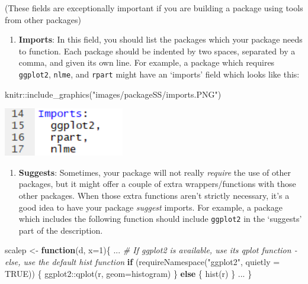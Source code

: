 \documentclass[
]{book}
\newenvironment{Shaded}{\begin{snugshade}}{\end{snugshade}}
\newcommand{\AttributeTok}[1]{\textcolor[rgb]{0.77,0.63,0.00}{#1}}
\newcommand{\CommentTok}[1]{\textcolor[rgb]{0.56,0.35,0.01}{\textit{#1}}}
\newcommand{\ConstantTok}[1]{\textcolor[rgb]{0.00,0.00,0.00}{#1}}
\newcommand{\ControlFlowTok}[1]{\textcolor[rgb]{0.13,0.29,0.53}{\textbf{#1}}}
\newcommand{\DecValTok}[1]{\textcolor[rgb]{0.00,0.00,0.81}{#1}}
\newcommand{\FunctionTok}[1]{\textcolor[rgb]{0.00,0.00,0.00}{#1}}
\newcommand{\NormalTok}[1]{#1}
\newcommand{\OtherTok}[1]{\textcolor[rgb]{0.56,0.35,0.01}{#1}}
\newcommand{\SpecialCharTok}[1]{\textcolor[rgb]{0.00,0.00,0.00}{#1}}
\newcommand{\StringTok}[1]{\textcolor[rgb]{0.31,0.60,0.02}{#1}}
\providecommand{\tightlist}{%
  \setlength{\itemsep}{0pt}\setlength{\parskip}{0pt}}
\begin{document}
(These fields are exceptionally important if you are building a package using tools from other packages)

\begin{enumerate}
\def\labelenumi{\arabic{enumi}.}
\setcounter{enumi}{11}
\tightlist
\item
  \textbf{Imports}: In this field, you should list the packages which your package needs to function. Each package should be indented by two spaces, separated by a comma, and given its own line. For example, a package which requires \texttt{ggplot2}, \texttt{nlme}, and \texttt{rpart} might have an `imports' field which looks like this:
\end{enumerate}

\begin{Shaded}
\begin{Highlighting}[]
\NormalTok{knitr}\SpecialCharTok{::}\FunctionTok{include\_graphics}\NormalTok{(}\StringTok{"images/packageSS/imports.PNG"}\NormalTok{)}
\end{Highlighting}
\end{Shaded}

\includegraphics[width=2.07in]{images/packageSS/imports}

\begin{enumerate}
\def\labelenumi{\arabic{enumi}.}
\setcounter{enumi}{12}
\tightlist
\item
  \textbf{Suggests}: Sometimes, your package will not really \emph{require} the use of other packages, but it might offer a couple of extra wrappers/functions with those other packages. When those extra functions aren't strictly necessary, it's a good idea to have your package \emph{suggest} imports. For example, a package which includes the following function should include \texttt{ggplot2} in the `suggests' part of the description.
\end{enumerate}

\begin{Shaded}
\begin{Highlighting}[]
\NormalTok{scalep }\OtherTok{\textless{}{-}} \ControlFlowTok{function}\NormalTok{(d, }\AttributeTok{x=}\DecValTok{1}\NormalTok{)\{}
\NormalTok{  ...}
  \CommentTok{\# If ggplot2 is available, use its qplot function {-} else, use the default hist function}
  \ControlFlowTok{if}\NormalTok{ (}\FunctionTok{requireNamespace}\NormalTok{(}\StringTok{"ggplot2"}\NormalTok{, }\AttributeTok{quietly =} \ConstantTok{TRUE}\NormalTok{)) \{}
\NormalTok{    ggplot2}\SpecialCharTok{::}\FunctionTok{qplot}\NormalTok{(r, }\AttributeTok{geom=}\StringTok{\textquotesingle{}histogram\textquotesingle{}}\NormalTok{)}
\NormalTok{  \} }\ControlFlowTok{else}\NormalTok{ \{}
    \FunctionTok{hist}\NormalTok{(r)}
\NormalTok{  \}}
\NormalTok{  ...}
\NormalTok{\}}
\end{Highlighting}
\end{Shaded}
\end{document}
